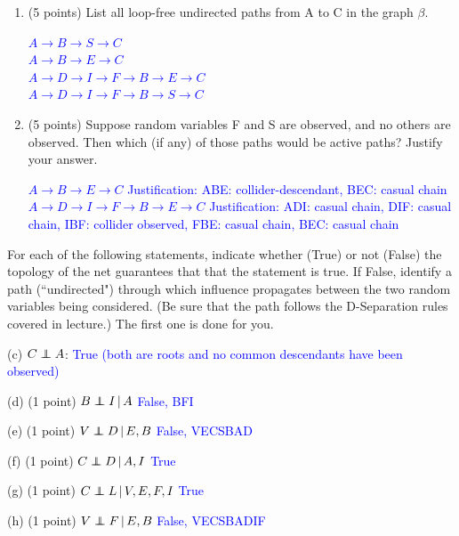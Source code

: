 \documentclass[12pt]{article}
\newenvironment{qparts}{\begin{enumerate}[{(}a{)}]}{\end{enumerate}}
\newcommand\independent{\protect\mathpalette{\protect\independenT}{\perp}}
\def\independenT#1#2{\mathrel{\rlap{$#1#2$}\mkern2mu{#1#2}}}
\def\independenT#1#2{\mathrel{\rlap{$#1#2$}\mkern2mu{#1#2}}}
\begin{document}
\begin{qparts}
  \item (5 points) List all loop-free undirected paths from A to C in the graph $\beta$.

  \textcolor{blue}{
    $A\rightarrow B\rightarrow S\rightarrow C$\\
    $A\rightarrow B\rightarrow E\rightarrow C$\\
    $A\rightarrow D\rightarrow I\rightarrow F\rightarrow B\rightarrow E\rightarrow C$\\
    $A\rightarrow D\rightarrow I\rightarrow F\rightarrow B\rightarrow S\rightarrow C$}

  \item (5 points) Suppose random variables F and S are observed, and no others are observed.  Then which (if any) of those paths would be active paths?  Justify your answer.

  \textcolor{blue}{$A\rightarrow B\rightarrow E\rightarrow C$ Justification: ABE: collider-descendant, BEC: casual chain\\
    $A\rightarrow D\rightarrow I\rightarrow F\rightarrow B\rightarrow E\rightarrow C$ Justification: ADI: casual chain, DIF: casual chain, IBF: collider observed, FBE: casual chain, BEC: casual chain}

\end{qparts}

For each of the following statements, indicate whether (True) or not (False) the topology of the net guarantees that that the statement is true.  If False, identify a path (``undirected") through which influence propagates between the two
random variables being considered. (Be sure that the path follows the D-Separation rules covered in lecture.)
The first one is done for you.

(c) $C \independent A$: \textcolor{blue}{True (both are roots and no common descendants have been observed) }


(d) (1 point) $B \independent I \,|\, A$ \textcolor{blue}{False, BFI}

(e) (1 point) $V \independent D \,|\, E, B$ \textcolor{blue}{False, VECSBAD}

(f) (1 point) $C \independent D \,|\, A, I$ \textcolor{blue}{True}

(g) (1 point) $C \independent L \,|\, V,E,F, I$ \textcolor{blue}{True}

(h) (1 point) $V \independent F \,|\,E, B$ \textcolor{blue}{False, VECSBADIF}
\end{document}
